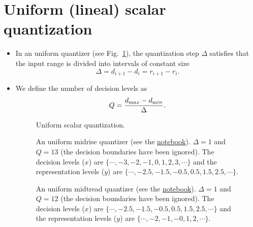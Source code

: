 \section{Uniform (lineal) scalar quantization}
\begin{itemize}

\item
  In an uniform quantizer (see Fig.~\ref{fig:cuantif}), the
  quantization step \(\Delta\) satisfies that the input range is
  divided into intervals of constant size
  \begin{equation}
    \Delta=d_{i+1}-d_i=r_{i+1}-r_i.
  \end{equation}
\item We define the number of decision levels as
  \begin{equation}
    Q=\frac{d_{\text max}-d_{\text min}}{\Delta}.
    \label{eq:delta_definition}
  \end{equation}

  \begin{figure}
    \caption{Uniform scalar quantization.}
    \label{fig:cuantif}
  \end{figure}

  \begin{figure}
    \caption{An uniform midrise quantizer (see the
      \href{https://nbviewer.jupyter.org/github/vicente-gonzalez-ruiz/quantization/blob/master/graphics/midrise.ipynb}{notebook}). $\Delta=1$
      and $Q=13$ (the decision boundaries have been ignored). The
      decision levels ($x$) are $\{\cdots,-3,-2,-1,0,1,2,3,\cdots\}$
      and the representation levels ($y$) are
      $\{\cdots,-2.5,-1.5,-0.5,0.5,1.5,2.5,\cdots\}$.}
    \label{fig:midrise}
  \end{figure}
  
  \begin{figure}
    \caption{An uniform midtread quantizer (see the
      \href{https://nbviewer.jupyter.org/github/vicente-gonzalez-ruiz/quantization/blob/master/graphics/midtread.ipynb}{notebook}). $\Delta=1$
      and $Q=12$ (the decision boundaries have been ignored). The
      decision levels ($x$) are $\{\cdots,-2.5,-1.5,-0.5,0.5,1.5,2.5,\cdots\}$
      and the representation levels ($y$) are
      $\{\cdots,-2,-1,-0,1,2,\cdots\}$.}
    \label{fig:midtread}
  \end{figure}


\end{itemize}
